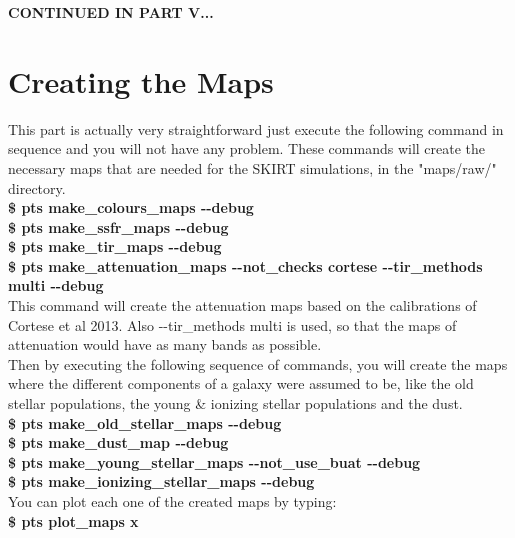 \documentclass[15pt,a4paper,oneside,openright]{report}
\begin{document}
\begin{center}
\textbf{CONTINUED IN PART V...}
\end{center}

\part{Creating the Maps}

This part is actually very straightforward just execute the following command in sequence and you will not have any problem. These commands will create the necessary maps that are needed for the SKIRT simulations, in the "maps/raw/" directory.\\

\textbf{\$ pts make\_colours\_maps -{}-debug}\\

\textbf{\$ pts make\_ssfr\_maps -{}-debug}\\

\textbf{\$ pts make\_tir\_maps -{}-debug}\\

\textbf{\$ pts make\_attenuation\_maps -{}-not\_checks cortese -{}-tir\_methods multi -{}-debug}\\

This command will create the attenuation maps based on the calibrations of Cortese et al 2013. Also -{}-tir\_methods multi is used, so that the maps of attenuation would have as many bands as possible.\\

Then by executing the following sequence of commands, you will create the maps where the different components of a galaxy were assumed to be, like the old stellar populations, the young \& ionizing stellar populations and the dust.\\

\textbf{\$ pts make\_old\_stellar\_maps -{}-debug}\\

\textbf{\$ pts make\_dust\_map -{}-debug}\\

\textbf{\$ pts make\_young\_stellar\_maps -{}-not\_use\_buat -{}-debug}\\

\textbf{\$ pts make\_ionizing\_stellar\_maps -{}-debug}\\

You can plot each one of the created maps by typing:\\

\textbf{\$ pts plot\_maps x}\\
 
\end{document}
